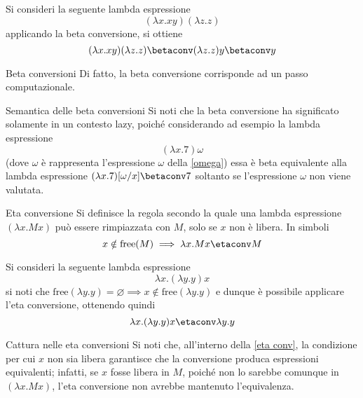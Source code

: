 \documentclass[a4paper, 12pt]{report}
\begin{document}
    \begin{example}
        Si consideri la seguente lambda espressione $$(\lambda x.xy)(\lambda z.z)$$ applicando la beta conversione, si ottiene $$(\lambda x.xy)(\lambda z.z) \betaconv (\lambda z.z)y \betaconv y$$
    \end{example}

    \begin{framedobs}{Beta conversioni}
        Di fatto, la beta conversione corrisponde ad un passo computazionale.
    \end{framedobs}

    \begin{framedobs}{Semantica delle beta conversioni}
        Si noti che la beta conversione ha significato solamente in un contesto lazy, poiché considerando ad esempio la lambda espressione $$(\lambda x.7) \omega$$ (dove $\omega$ è rappresenta l'espressione $\omega$ della \cref{omega}) essa è beta equivalente alla lambda espressione $(\lambda x.7)[\omega/x] \betaconv 7$ soltanto se l'espressione $\omega$ non viene valutata.
    \end{framedobs}

    \begin{frameddefn}[label={eta conv}]{Eta conversione}
        Si definisce  la regola secondo la quale una lambda espressione $(\lambda x.Mx)$ può essere rimpiazzata con $M$, solo se $x$ non è libera. In simboli $$x \notin \mathrm{free}(M) \implies \lambda x.Mx \etaconv M$$
    \end{frameddefn}

    \begin{example}
        Si consideri la seguente lambda espressione $$\lambda x.(\lambda y.y)x$$ si noti che $\mathrm{free}(\lambda y.y) = \varnothing \implies x \notin \mathrm{free}(\lambda y.y)$ e dunque è possibile applicare l'eta conversione, ottenendo quindi $$\lambda x .(\lambda y.y) x \etaconv \lambda y.y$$
    \end{example}

    \begin{framedobs}{Cattura nelle eta conversioni}
        Si noti che, all'interno della \cref{eta conv}, la condizione per cui $x$ non sia libera garantisce che la conversione produca espressioni equivalenti; infatti, se $x$ fosse libera in $M$, poiché non lo sarebbe comunque in $(\lambda x.Mx)$, l'eta conversione non avrebbe mantenuto l'equivalenza.
    \end{framedobs}
\end{document}

